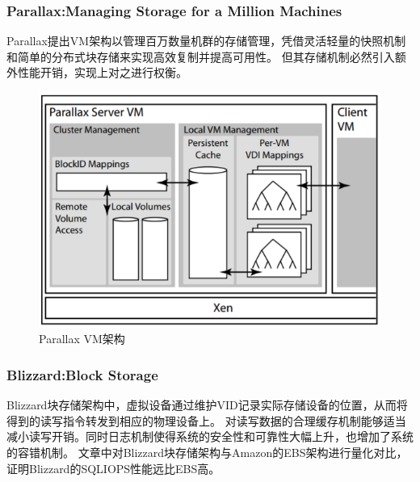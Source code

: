 \subsubsection{Parallax:Managing Storage for a Million Machines\cite{warfield2005parallax}}
Parallax提出VM架构以管理百万数量机群的存储管理，凭借灵活轻量的快照机制和简单的分布式块存储来实现高效复制并提高可用性。
但其存储机制必然引入额外性能开销，实现上对之进行权衡。

\begin{figure}
\centering
\includegraphics[scale=0.8]{Figures/storage/parallax.jpg}
\decoRule
\caption{Parallax VM架构}
\label{fig:parallax}
\end{figure}
\subsubsection{Blizzard:Block Storage\cite{mickens2014blizzard}}
Blizzard块存储架构中，虚拟设备通过维护VID记录实际存储设备的位置，从而将得到的读写指令转发到相应的物理设备上。
对读写数据的合理缓存机制能够适当减小读写开销。同时日志机制使得系统的安全性和可靠性大幅上升，也增加了系统的容错机制。
文章中对Blizzard块存储架构与Amazon的EBS架构进行量化对比，证明Blizzard的SQLIOPS性能远比EBS高。

